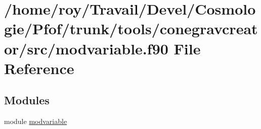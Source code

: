\hypertarget{conegravcreator_2src_2modvariable_8f90}{}\section{/home/roy/\+Travail/\+Devel/\+Cosmologie/\+Pfof/trunk/tools/conegravcreator/src/modvariable.f90 File Reference}
\label{conegravcreator_2src_2modvariable_8f90}
\subsection*{Modules}
\begin{DoxyCompactItemize}
\item 
module \hyperlink{namespacemodvariable}{modvariable}
\end{DoxyCompactItemize}
